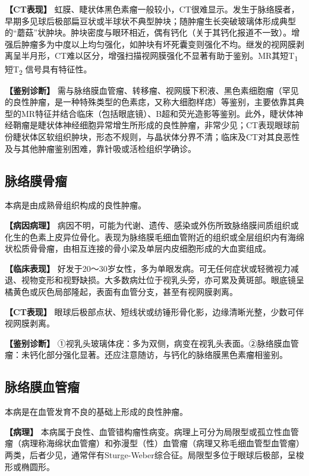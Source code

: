 \textbf{【CT表现】}
虹膜、睫状体黑色素瘤一般较小，CT很难显示。发生于脉络膜者，早期多见球后极部扁豆状或半球状不典型肿块；随肿瘤生长突破玻璃体形成典型的“蘑菇”状肿块。肿块密度与眼环相近，偶有钙化（关于其钙化报道不一致）。增强后肿瘤多为中度以上均匀强化，如肿块有坏死囊变则强化不均。继发的视网膜剥离呈半月形，CT难以区分，增强扫描视网膜强化不显著有助于鉴别。MR其短T\textsubscript{1}
短T\textsubscript{2} 信号具有特征性。

\textbf{【鉴别诊断】}
需与脉络膜血管瘤、转移瘤、视网膜下积液、黑色素细胞瘤（罕见的良性肿瘤，是一种特殊类型的色素痣，又称大细胞样痣）等鉴别，主要依靠其典型的MR特征并结合临床（包括眼底镜）、B超和荧光造影等鉴别。此外，睫状体神经鞘瘤是睫状体神经细胞异常增生所形成的良性肿瘤，非常少见；CT表现眼球前份睫状体区软组织肿块，形态不规则，与晶状体分界不清；临床及CT对其良恶性及与其他肿瘤鉴别困难，靠针吸或活检组织学确诊。

\subsection{脉络膜骨瘤}

本病是由成熟骨组织构成的良性肿瘤。

\textbf{【病因病理】}
病因不明，可能为代谢、遗传、感染或外伤所致脉络膜间质组织或化生的色素上皮异位骨化。表现为脉络膜毛细血管附近的组织或全层组织内有海绵状松质骨骨瘤，由相互连接的骨小梁及单层内皮细胞形成的大血窦组成。

\textbf{【临床表现】}
好发于20～30岁女性，多为单眼发病。可无任何症状或轻微视力减退、视物变形和视野缺损。大多数病灶位于视乳头旁，亦可累及黄斑部。眼底镜呈橘黄色或灰色局部隆起，表面有血管分支，甚至有视网膜剥离。

\textbf{【CT表现】}
眼球后极部点状、短线状或纺锤形骨化影，边缘清晰光整，少数可伴视网膜剥离。

\textbf{【鉴别诊断】}
①视乳头玻璃体疣：多为双侧，病变在视乳头表面。②脉络膜血管瘤：未钙化部分强化显著。还应注意随访，与钙化的脉络膜黑色素瘤相鉴别。

\subsection{脉络膜血管瘤}

本病是在血管发育不良的基础上形成的良性肿瘤。

\textbf{【病理】}
本病属于良性、血管错构瘤性病变。病理上可分为局限型或孤立性血管瘤（病理称海绵状血管瘤）和弥漫型（性）血管瘤（病理又称毛细血管型血管瘤）两类，后者少见，通常伴有Sturge-Weber综合征。局限型多位于眼球后极部，呈梭形或椭圆形。

